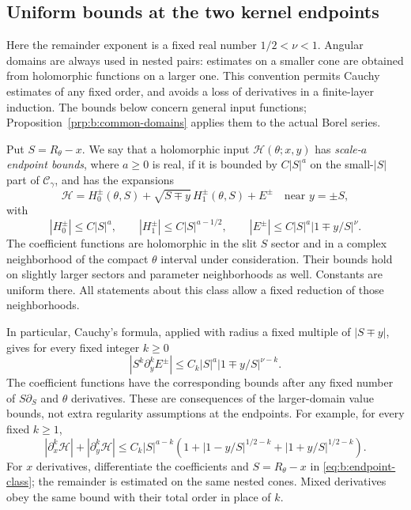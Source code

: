 \subsection{Uniform bounds at the two kernel endpoints}
\label{subsec:b:endpoints}

Here the remainder exponent is a fixed real number
$1/2<\nu<1$. Angular domains are always used in nested pairs:
estimates on a smaller cone are obtained from holomorphic functions
on a larger one. This convention permits Cauchy estimates of any
fixed order, and avoids a loss of derivatives in a finite-layer
induction. The bounds below concern general input functions;
Proposition~\ref{prp:b:common-domains} applies them to the actual
Borel series.

Put $S=R_\theta-x$. We say that a holomorphic input
$\mathcal H(\theta;x,y)$ has \emph{scale-$a$ endpoint bounds},
where $a\geq0$ is real, if it is bounded by $C|S|^a$ on the small-$|S|$
part of $\mathcal C_\gamma$, and has the expansions
\begin{equation}\label{eq:b:endpoint-class}
 \mathcal H
 =H_0^\pm(\theta,S)+\sqrt{S\mp y}\,H_1^\pm(\theta,S)+E^\pm
                 \quad\text{near }y=\pm S,
\end{equation}
with
\begin{equation}\label{eq:b:endpoint-norms}
 |H_0^\pm|\leq C|S|^a,\qquad
 |H_1^\pm|\leq C|S|^{a-1/2},\qquad
 |E^\pm|\leq C|S|^a|1\mp y/S|^\nu.
\end{equation}
The coefficient functions are holomorphic in the slit $S$ sector
and in a complex neighborhood of the compact $\theta$ interval
under consideration. Their bounds hold on slightly larger sectors
and parameter neighborhoods as well. Constants are uniform there.
All statements about this class allow a fixed reduction of those
neighborhoods.

In particular, Cauchy's formula, applied with radius a fixed
multiple of $|S\mp y|$, gives for every fixed integer $k\geq0$
\begin{equation}\label{eq:b:remainder-derivatives}
 |S^k\partial_y^k E^\pm|
       \leq C_k|S|^a|1\mp y/S|^{\nu-k}.
\end{equation}
The coefficient functions have the corresponding bounds after any
fixed number of $S\partial_S$ and $\theta$ derivatives. These are
consequences of the larger-domain value bounds, not extra regularity
assumptions at the endpoints. For example, for every fixed $k\geq1$,
\begin{equation}\label{eq:b:input-derivatives}
 |\partial_x^k\mathcal H|+|\partial_y^k\mathcal H|
 \leq C_k|S|^{a-k}
 \left(1+|1-y/S|^{1/2-k}+|1+y/S|^{1/2-k}\right).
\end{equation}
For $x$ derivatives, differentiate the coefficients and
$S=R_\theta-x$ in \eqref{eq:b:endpoint-class}; the remainder is
estimated on the same nested cones. Mixed derivatives obey the
same bound with their total order in place of $k$.

